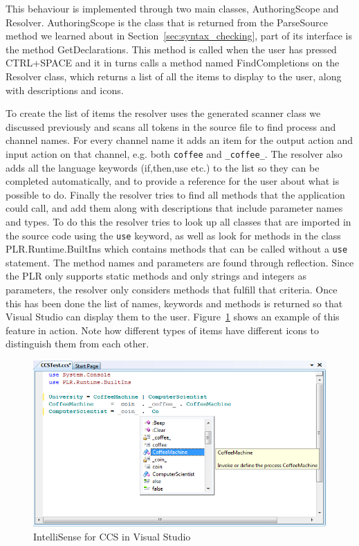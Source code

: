 	This behaviour is implemented through two main classes, 
	\textsf{AuthoringScope} and \textsf{Resolver}. \textsf{AuthoringScope} is 
	the class that is returned from the \textsf{ParseSource} method we learned 
	about in Section~\ref{sec:syntax_checking}, part of its interface is the 
	method \textsf{GetDeclarations}. This method is called when the user has 
	pressed CTRL+SPACE and it in turns calls a method named 
	\textsf{FindCompletions} on the \textsf{Resolver} class, which returns a 
	list of all the items to display to the user, along with descriptions and 
	icons. 
	
	To create the list of items the resolver uses the generated scanner class we 
	discussed previously and scans all tokens in the source file to find 
	process and channel names. For every channel name it adds an item for the 
	output action and input action on that channel, e.g. both \texttt{coffee} 
	and \texttt{\_coffee\_}. The resolver also adds all the language keywords 
	(if,then,use etc.) to the list so they can be completed automatically, and 
	to provide a reference for the user about what is possible to do. Finally 
	the resolver tries to find all methods that the application could call, and 
	add them along with descriptions that include parameter names and types. To 
	do this the resolver tries to look up all classes that are imported in the 
	source code using the \texttt{use} keyword, as well as look for methods in 
	the class \textsf{PLR.Runtime.BuiltIns} which contains methods that can be 
	called without a \texttt{use} statement. The method names and parameters are 
	found through reflection. Since the PLR only supports static methods and 
	only strings and integers as parameters, the resolver only considers methods 
	that fulfill that criteria. Once this has been done the list of names, 
	keywords and methods is returned so that Visual Studio can display them to 
	the user. Figure~\ref{fig:intellisense} shows an example of this feature in 
	action. Note how different types of items have different icons to 
	distinguish them from each other.

	\begin{figure}[h!]
		\centering
		\includegraphics[scale=0.5]{intellisense.png}
		\caption{IntelliSense for CCS in Visual Studio}
		\label{fig:intellisense}
	\end{figure}
	
